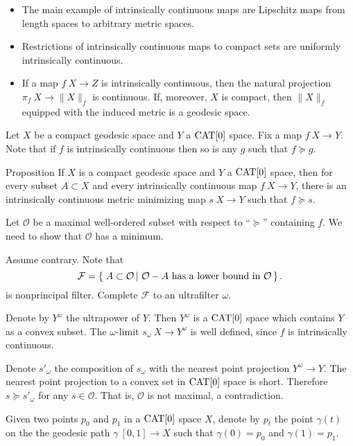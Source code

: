 \documentclass{article}
\begin{document}
\begin{itemize}
 \item The main example of intrinsically continuous maps are Lipschitz
maps from length spaces to arbitrary metric spaces.
\item Restrictions of intrinsically continuous maps to compact sets are uniformly intrinsically continuous. %
\item If a map $f\:X\to Z$ is intrinsically continuous, then 
the natural projection $\pi_f\:X\rightarrow \|X\|_f$ is continuous. 
If, moreover, $X$ is compact, then $\|X\|_f$ equipped with the induced 
metric is a geodesic space.
\end{itemize}


Let $X$ be a compact geodesic space and $Y$ a $\mathop{\rm CAT}\nolimits[0]$ space. 
Fix a map $f\:X\to Y$.
Note that if $f$ is intrinsically continuous then so is any $g$ such that $f\succcurlyeq g$.

\begin{thm}{Proposition}\label{prop:exist}
If $X$ is a compact geodesic space and $Y$ a $\mathop{\rm CAT}\nolimits[0]$ space, then for every subset $A\subset X$ and every intrinsically continuous map $f\:X\rightarrow Y$,
there is an intrinsically continuous  metric minimizing map $s\:X\rightarrow Y$
such that $f\succcurlyeq s$.
\end{thm}

Let $\mathcal{O}$ be a maximal well-ordered subset with respect to ``$\succcurlyeq$'' containing $f$. 
We need to show that $\mathcal{O}$ has a minimum.

Assume contrary.
Note that
$$
\mathcal{F}
=
\set{A\subset\mathcal{O}}{\mathcal{O}-A\text{ has a lower bound in }\mathcal{O}}.
$$
is nonprincipal filter.
Complete $\mathcal{F}$ to an ultrafilter $\omega$. 

Denote by $Y^\omega$ the ultrapower of $Y$. 
Then $Y^\omega$
is a $\mathop{\rm CAT}\nolimits[0]$ space which contains $Y$ as a convex subset. 
The $\omega$-limit $s_\omega\:X\to Y^\omega$ is well defined, since
$f$ is intrinsically continuous. 

Denote $s'_\omega$ the composition of $s_\omega$ with the nearest point projection $Y^\omega\to Y$.
The nearest point projection to a convex set in $\mathop{\rm CAT}\nolimits[0]$ space is short.
Therefore $s\succcurlyeq s'_\omega$ for any $s\in \mathcal{O}$.
That is, $\mathcal{O}$ is not maximal, a contradiction.
\qeds

Given two points $p_0$ and $p_1$ in a $\mathop{\rm CAT}\nolimits[0]$ space $X$,
denote by $p_t$ the point $\gamma(t)$ on the 
the geodesic path $\gamma\:[0,1]\to X$ such that $\gamma(0)=p_0$ and $\gamma(1)=p_1$.
\end{document}
